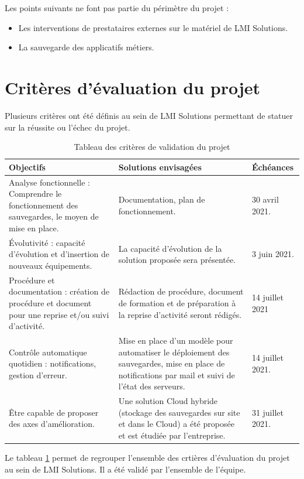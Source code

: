 \documentclass[pfe]{tnreport} %
\begin{document}
Les points suivants ne font pas partie du périmètre du projet : \newline

\begin{itemize}
 \item Les interventions de prestataires externes sur le matériel de LMI Solutions.
 \item La sauvegarde des applicatifs métiers.
\end{itemize}
\newpage
\section{Critères d'évaluation du projet}

Plusieurs critères ont été définis au sein de LMI Solutions permettant de statuer sur la réussite ou l'échec du projet.

\begin{table}[!h]
 \centering
 \begin{tabular}{|p{7cm}|p{5cm}|p{4cm}|}
 \hline Objectifs & Solutions envisagées & Échéances\\
 \hline Analyse fonctionnelle : Comprendre le fonctionnement des sauvegardes, le moyen de mise en place. & Documentation, plan de fonctionnement. & 30 avril 2021.\\
  \hline Évolutivité : capacité d’évolution et d’insertion de nouveaux équipements. & La capacité d'évolution de la solution proposée sera présentée. & 3 juin 2021. \\
 \hline Procédure et documentation : création de procédure et document pour une reprise et/ou suivi d'activité. & Rédaction de procédure, document de formation et de préparation à la reprise d'activité seront rédigés. & 14 juillet 2021\\
 \hline Contrôle automatique quotidien : notifications, gestion d'erreur. & Mise en place d'un modèle pour automatiser le déploiement des sauvegardes, mise en place de notifications par mail et suivi de l'état des serveurs. & 14 juillet 2021. \\
\hline Être capable de proposer des axes d’amélioration. & Une solution Cloud hybride (stockage des sauvegardes sur site et dans le Cloud) a été proposée et est étudiée par l’entreprise. & 31 juillet 2021. \\
 \hline 
 \end{tabular}
 \caption{Tableau des critères de validation du projet}
 \label{tab:critere}
\end{table}

Le tableau \ref{tab:critere} permet de regrouper l'ensemble des crtières d'évaluation du projet au sein de LMI Solutions. \newline
Il a été validé par l'ensemble de l'équipe. \newline
\end{document}

